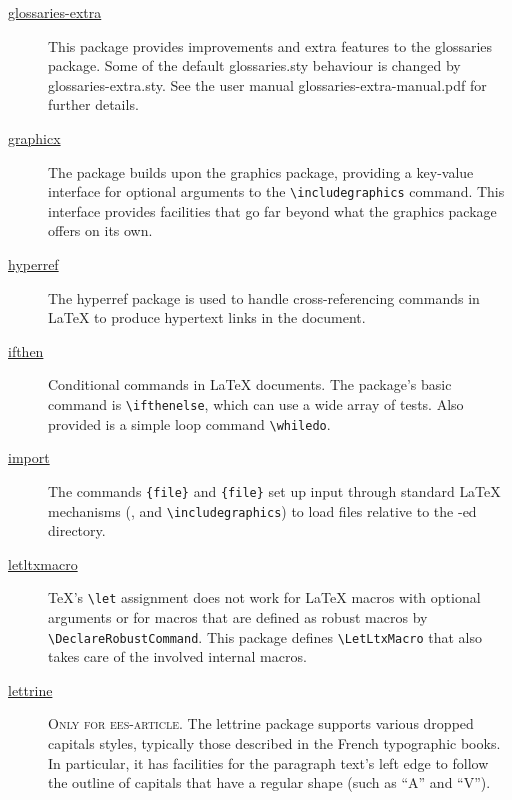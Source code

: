 \begin{description}
	\item[\href{https://www.ctan.org/pkg/glossaries-extra}{glossaries-extra}] This package provides improvements and extra features to the glossaries package. Some of the default glossaries.sty behaviour is changed by glossaries-extra.sty. See the user manual glossaries-extra-manual.pdf for further details. \cite{CTANTeam.2020ah}
	
	\item[\href{https://www.ctan.org/pkg/graphicx}{graphicx}] The package builds upon the graphics package, providing a key-value interface for optional arguments to the \verb|\includegraphics| command. This interface provides facilities that go far beyond what the graphics package offers on its own. \cite{CTANTeam.2020j}
	
	\item[\href{https://www.ctan.org/pkg/hyperref}{hyperref}] The hyperref package is used to handle cross-referencing commands in {\LaTeX} to produce hypertext links in the document. \cite{CTANTeam.2020u}
	
	\item[\href{https://www.ctan.org/pkg/ifthen}{ifthen}] Conditional commands in {\LaTeX} documents. The package's basic command is \verb|\ifthenelse|, which can use a wide array of tests. Also provided is a simple loop command \verb|\whiledo|. \cite{CTANTeam.2020ai}
	
	\item[\href{https://www.ctan.org/pkg/import}{import}] The commands \verb|{file}| and \verb|{file}| set up input through standard {\LaTeX} mechanisms (\verb||, \verb|| and \verb|\includegraphics|) to load files relative to the \verb||-ed directory. \cite{CTANTeam.2020av}
	
	\item[\href{https://www.ctan.org/pkg/letltxmacro}{letltxmacro}] {\TeX}'s \verb|\let| assignment does not work for {\LaTeX} macros with optional arguments or for macros that are defined as robust macros by \verb|\DeclareRobustCommand|. This package defines \verb|\LetLtxMacro| that also takes care of the involved internal macros. \cite{CTANTeam.2020bf}
	
	\item[\href{https://www.ctan.org/pkg/lettrine}{lettrine}] \textsc{Only for ees-article.} The lettrine package supports various dropped capitals styles, typically those described in the French typographic books. In particular, it has facilities for the paragraph text's left edge to follow the outline of capitals that have a regular shape (such as \enquote{A} and \enquote{V}). \cite{CTANTeam.2020bw}
	

\end{description}
